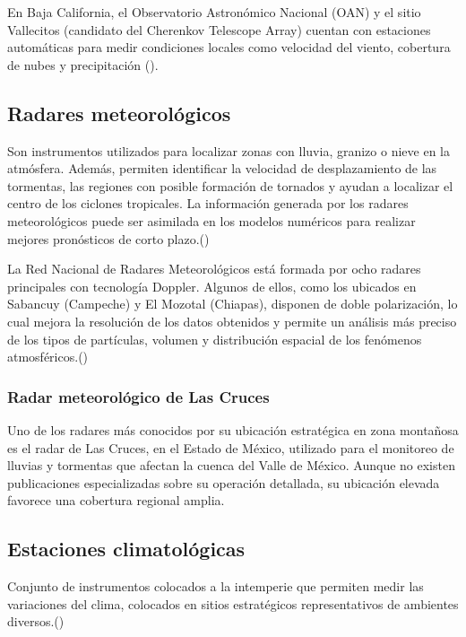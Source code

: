 En Baja California, el Observatorio Astronómico Nacional (OAN) y el sitio Vallecitos (candidato del Cherenkov Telescope Array) cuentan con estaciones automáticas para medir condiciones locales como velocidad del viento, cobertura de nubes y precipitación  (\cite{garcia2020, vallecitos2016}).

\subsection{Radares meteorológicos}

\begin{definition}
Son instrumentos utilizados para localizar zonas con lluvia, granizo o nieve en la atmósfera. Además, permiten identificar la velocidad de desplazamiento de las tormentas, las regiones con posible formación de tornados y ayudan a localizar el centro de los ciclones tropicales. La información generada por los radares meteorológicos puede ser asimilada en los modelos numéricos para realizar mejores pronósticos de corto plazo.(\cite{smn2025})
\end{definition}

La Red Nacional de Radares Meteorológicos está formada por ocho radares principales con tecnología Doppler. Algunos de ellos, como los ubicados en Sabancuy (Campeche) y El Mozotal (Chiapas), disponen de doble polarización, lo cual mejora la resolución de los datos obtenidos y permite un análisis más preciso de los tipos de partículas, volumen y distribución espacial de los fenómenos atmosféricos.(\cite{smn_radar65_2025})

\subsubsection{Radar meteorológico de Las Cruces}

Uno de los radares más conocidos por su ubicación estratégica en zona montañosa es el radar de Las Cruces, en el Estado de México, utilizado para el monitoreo de lluvias y tormentas que afectan la cuenca del Valle de México. Aunque no existen publicaciones especializadas sobre su operación detallada, su ubicación elevada favorece una cobertura regional amplia.

\subsection{Estaciones climatológicas}

\begin{definition}
    Conjunto de instrumentos colocados a la intemperie que permiten medir las variaciones del clima, colocados en sitios estratégicos representativos de ambientes diversos.(\cite{conagua_estaciones_climatologicas_2013})
\end{definition}
